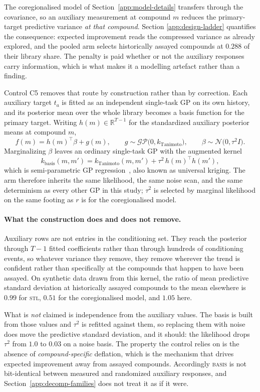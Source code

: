 \documentclass[10pt]{article}
\newcommand{\stl}{\textsc{stl}}
\newcommand{\basis}{\textsc{basis}}
\begin{document}
The coregionalised model of Section~\ref{app:model-details} transfers through
the covariance, so an auxiliary measurement at compound $m$ reduces the
primary-target predictive variance \emph{at that compound}. Section
\ref{app:design-ladder} quantifies the consequence: expected improvement reads
the compressed variance as already explored, and the pooled arm selects
historically assayed compounds at $0.288$ of their library share. The penalty
is paid whether or not the auxiliary responses carry information, which is
what makes it a modelling artefact rather than a finding.

Control C5 removes that route by construction rather than by correction. Each
auxiliary target $t_a$ is fitted as an independent single-task GP on its own
history, and its posterior mean over the whole library becomes a basis
function for the primary target. Writing $h(m)\in\mathbb R^{T-1}$ for the
standardized auxiliary posterior means at compound $m$,
\[
f(m)=h(m)^\top\beta+g(m),\qquad
g\sim\mathcal{GP}\big(0,k_{\mathrm{Tanimoto}}\big),\qquad
\beta\sim\mathcal N\big(0,\tau^2 I\big).
\]
Marginalizing $\beta$ leaves an ordinary single-task GP with the augmented
kernel
\[
k_{\mathrm{basis}}(m,m')=k_{\mathrm{Tanimoto}}(m,m')+\tau^2\,h(m)^\top h(m'),
\]
which is semi-parametric GP regression~\cite[\S2.7]{rasmussen2006gp}, also
known as universal kriging. The arm therefore inherits the same
likelihood, the same noise scan, and the same determinism as every other GP
in this study; $\tau^2$ is selected by marginal likelihood on the same footing
as $r$ is for the coregionalised model.

\paragraph{What the construction does and does not remove.}
Auxiliary rows are not entries in the conditioning set. They reach the
posterior through $T-1$ fitted coefficients rather than through hundreds of
conditioning events, so whatever variance they remove, they remove wherever
the trend is confident rather than specifically at the compounds that happen
to have been assayed. On synthetic data drawn from this kernel, the ratio of
mean predictive standard deviation at historically assayed compounds to the
mean elsewhere is $0.99$ for \stl{}, $0.51$ for the coregionalised model, and
$1.05$ here.

What is \emph{not} claimed is independence from the auxiliary values. The
basis is built from those values and $\tau^2$ is refitted against them, so
replacing them with noise does move the predictive standard deviation, and it
should: the likelihood drops $\tau^2$ from $1.0$ to $0.03$ on a noise basis.
The property the control relies on is the absence of \emph{compound-specific}
deflation, which is the mechanism that drives expected improvement away from
assayed compounds. Accordingly \basis{} is not bit-identical between measured
and randomized auxiliary responses, and Section~\ref{app:decomp-families} does
not treat it as if it were.
\end{document}
